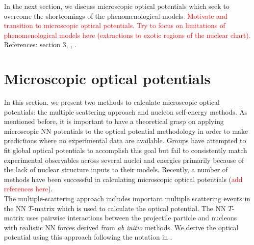 \documentclass[preprintnumbers,floatfix,aps,prc,preprint,nofootinbib]{revtex4-1}
\begin{document}
In the next section, we discuss microscopic optical potentials which seek to overcome the shortcomings of the phenomenological models. \textcolor{red}{Motivate and transition to microscopic optical potentials. Try to focus on limitations of phenomenological models here (extractions to exotic regions of the nuclear chart).}
\\

References: \cite{Dickhoff:2018wdd} section 3, \cite{Perey:1976zz}, \cite{Koning:2003zz}.


\section{Microscopic optical potentials}
\label{sec:microscopic}


In this section, we present two methods to calculate microscopic optical potentials: the multiple scattering approach and nucleon self-energy methods. As mentioned before, it is important to have a theoretical grasp on applying microscopic NN potentials to the optical potential methodology in order to make predictions where no experimental data are available. Groups have attempted to fit global optical potentials to accomplish this goal but fail to consistently match experimental observables across several nuclei and energies primarily because of the lack of nuclear structure inputs to their models. Recently, a number of methods have been successful in calculating microscopic optical potentials (\textcolor{red}{add references here}).
\\


The multiple-scattering approach includes important multiple scattering events in the NN $T$-matrix which is used to calculate the optical potential. The NN $T$-matrix uses pairwise interactions between the projectile particle and nucleons with realistic NN forces derived from \textit{ab initio} methods. We derive the optical potential using this approach following the notation in \cite{Dickhoff:2018wdd}.
\\
\end{document}
